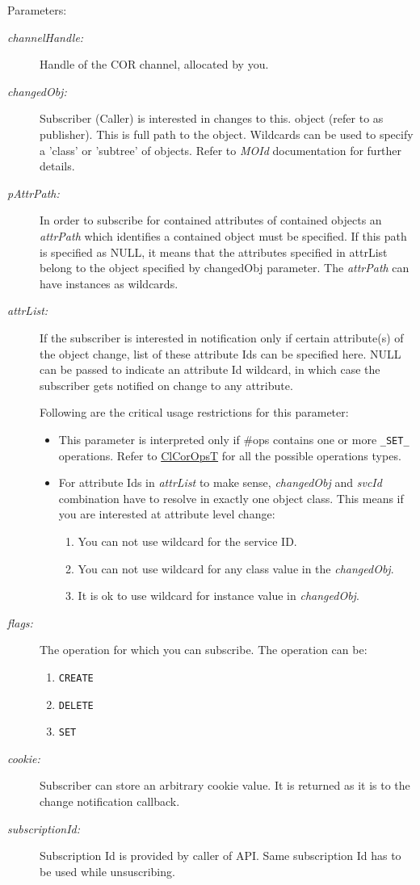 \begin{Desc}
\item[Parameters:]
\begin{description}
\item[{\em channel\-Handle:}]Handle of the COR channel, allocated by you.\item[{\em changed\-Obj:}]Subscriber (Caller) is interested in changes to this. object (refer to as publisher). This is full path to the object. Wildcards can be used to specify a 'class' or 'subtree' of objects. Refer to {\em MOId\/} documentation for further details.\item[{\em p\-Attr\-Path:}]In order to subscribe for contained attributes of contained objects an {\em attr\-Path\/} which identifies a contained object must be specified. If this path is specified as NULL, it means that the attributes specified in attr\-List belong to the object specified by changed\-Obj parameter. The {\em attr\-Path\/} can have instances as wildcards.\item[{\em attr\-List:}]If the subscriber is interested in notification only if certain attribute(s) of the object change, list of these attribute Ids can be specified here. NULL can be passed to indicate an attribute Id wildcard, in which case the subscriber gets notified on change to any attribute. \par
 Following are the critical usage restrictions for this parameter:\begin{itemize}
\item This parameter is interpreted only if \#ops contains one or more {\tt \_\-SET\_\-} operations. Refer to \hyperlink{group__group13_ga333}{Cl\-Cor\-Ops\-T} for all the possible operations types.\item For attribute Ids in {\em attr\-List\/} to make sense, {\em changed\-Obj\/} and {\em svc\-Id\/} combination have to resolve in exactly one object class. This means if you are interested at attribute level change:\begin{enumerate}
\item You can not use wildcard for the service ID.\item You can not use wildcard for any class value in the {\em changed\-Obj\/}.\item It is ok to use wildcard for instance value in {\em changed\-Obj\/}.\end{enumerate}
\end{itemize}
\item[{\em flags:}]The operation for which you can subscribe. The operation can be:\begin{enumerate}
\item {\tt CREATE} \item {\tt DELETE} \item {\tt SET} \end{enumerate}
\item[{\em cookie:}]Subscriber can store an arbitrary cookie value. It is returned as it is to the change notification callback.\item[{\em subscription\-Id:}]Subscription Id is provided by caller of API. Same subscription Id has to be used while unsuscribing.\end{description}
\end{Desc}
